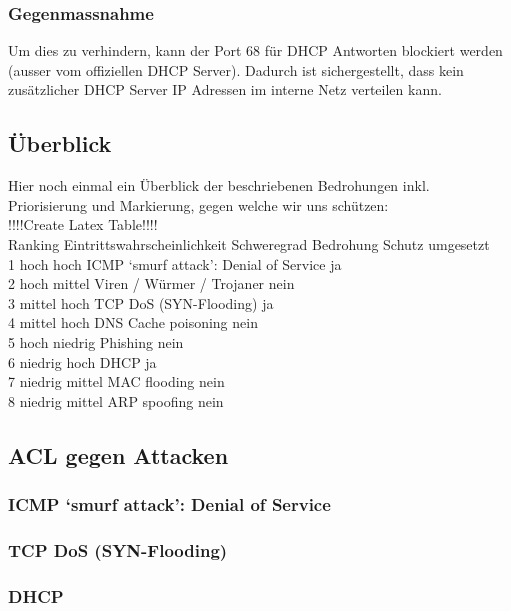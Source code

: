 \documentclass[11pt,a4paper,parskip=half]{scrartcl}
\begin{document}
\subsubsection{Gegenmassnahme}
Um dies zu verhindern, kann der Port 68 für DHCP Antworten blockiert werden (ausser vom offiziellen DHCP Server). Dadurch ist sichergestellt, dass kein zusätzlicher DHCP Server IP Adressen im interne Netz verteilen kann.

\subsection{Überblick}
Hier noch einmal ein Überblick der beschriebenen Bedrohungen inkl. Priorisierung und Markierung, gegen welche wir uns schützen:\\
!!!!Create Latex Table!!!!\\
Ranking	Eintrittswahrscheinlichkeit		Schweregrad		Bedrohung					Schutz umgesetzt\\
1		hoch					hoch			ICMP ‘smurf attack’: Denial of Service	ja\\
2		hoch					mittel			Viren / Würmer / Trojaner			nein\\
3		mittel					hoch			TCP DoS (SYN-Flooding)			ja\\
4		mittel					hoch			DNS Cache poisoning			nein\\
5		hoch					niedrig		Phishing					nein\\
6		niedrig				hoch			DHCP						ja\\
7		niedrig				mittel			MAC flooding					nein\\
8		niedrig				mittel			ARP spoofing				nein\\

\subsection{ACL gegen Attacken}
\subsubsection{ICMP ‘smurf attack’: Denial of Service}
\subsubsection{TCP DoS (SYN-Flooding)}
\subsubsection{DHCP}
\end{document}
